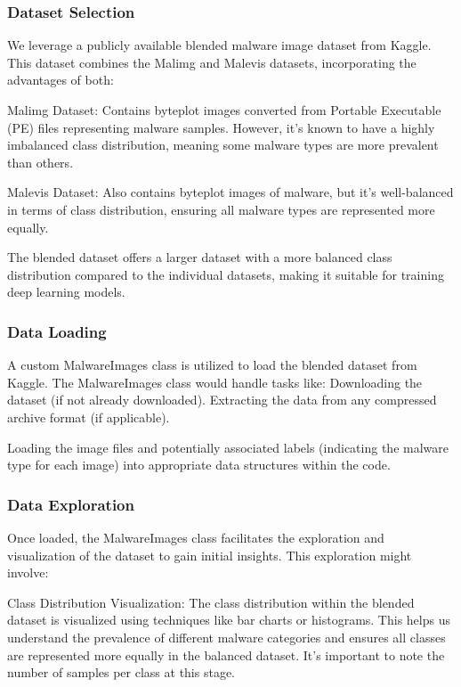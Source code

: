 \documentclass[conference]{IEEEtran}
\begin{document}
\subsubsection{Dataset Selection}

    We leverage a publicly available blended malware image dataset from Kaggle. This dataset combines the Malimg and Malevis datasets, incorporating the advantages of both:
    
        Malimg Dataset: Contains byteplot images converted from Portable Executable (PE) files representing malware samples. However, it's known to have a highly imbalanced class distribution, meaning some malware types are more prevalent than others.
        
        Malevis Dataset: Also contains byteplot images of malware, but it's well-balanced in terms of class distribution, ensuring all malware types are represented more equally.
        
    The blended dataset offers a larger dataset with a more balanced class distribution compared to the individual datasets, making it suitable for training deep learning models.

\subsubsection{Data Loading}

    A custom MalwareImages class is utilized to load the blended dataset from Kaggle. 
    The MalwareImages class would handle tasks like:
        Downloading the dataset (if not already downloaded).
        Extracting the data from any compressed archive format (if applicable).

        Loading the image files and potentially associated labels (indicating the malware type for each image) into appropriate data structures within the code.

\subsubsection{Data Exploration}

    Once loaded, the MalwareImages class facilitates the exploration and visualization of the dataset to gain initial insights. This exploration might involve:
    
        Class Distribution Visualization: The class distribution within the blended dataset is visualized using techniques like bar charts or histograms. This helps us understand the prevalence of different malware categories and ensures all classes are represented more equally in the balanced dataset. It's important to note the number of samples per class at this stage.
        
\end{document}

